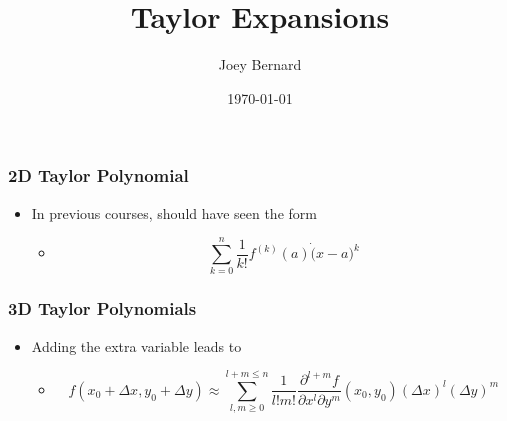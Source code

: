 \documentclass{beamer}
\title{Taylor Expansions}
\author{Joey Bernard}
\institute{University of New Brunswick}
\date{\today}
\begin{document}
\begin{frame}
  \titlepage
\end{frame}

\begin{frame}
  \frametitle{2D Taylor Polynomial}
  \begin{itemize}
  \item In previous courses, should have seen the form
    \begin{itemize}
    \item \[ \sum_{k=0}^{n} \frac{1}{k!} f^{(k)}(a) \dot (x - a)^k \]
    \end{itemize}
  \end{itemize}
\end{frame}

\begin{frame}
  \frametitle{3D Taylor Polynomials}
  \begin{itemize}
  \item Adding the extra variable leads to
    \begin{itemize}
    \item \[ f(x_0 + \Delta x, y_0 + \Delta y) \approx \sum_{l,m \geq 0}^{l+m \leq n} \frac{1}{l! m!} \frac{\partial^{l+m}f}{\partial x^l \partial y^m}(x_0, y_0)(\Delta x)^l (\Delta y)^m \]
    \end{itemize}
  \end{itemize}
\end{frame}
\end{document}
